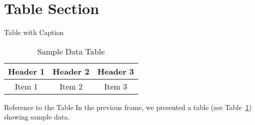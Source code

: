 \section{Table Section}
\label{table_section}

\begin{frame}{Table with Caption}
  \begin{table}
    \caption{Sample Data Table}
    \label{tab:sampledata}
    \centering
    \begin{tabular}{|c|c|c|}
      \hline
      Header 1 & Header 2 & Header 3 \\
      \hline
      Item 1 & Item 2 & Item 3 \\
      \hline
    \end{tabular}
  \end{table}
\end{frame}

\begin{frame}{Reference to the Table}
  In the previous frame, we presented a table (see Table~\ref{tab:sampledata}) showing sample data.
\end{frame}
